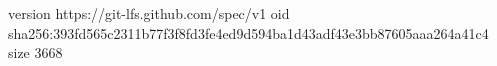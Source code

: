 version https://git-lfs.github.com/spec/v1
oid sha256:393fd565c2311b77f3f8fd3fe4ed9d594ba1d43adf43e3bb87605aaa264a41c4
size 3668
